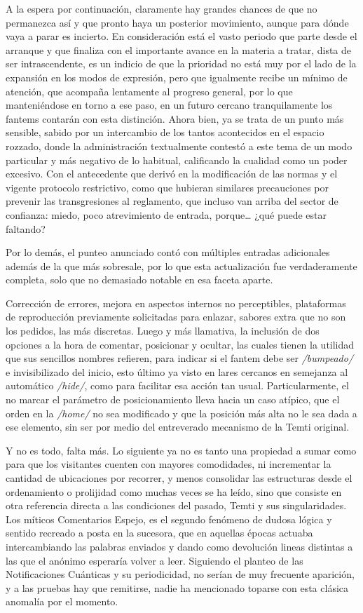 \documentclass[
]{book}
\begin{document}
A la espera por continuación, claramente hay grandes chances de que no permanezca así y que pronto haya un posterior movimiento, aunque para dónde vaya a parar es incierto. En consideración está el vasto periodo que parte desde el arranque y que finaliza con el importante avance en la materia a tratar, dista de ser intrascendente, es un indicio de que la prioridad no está muy por el lado de la expansión en los modos de expresión, pero que igualmente recibe un mínimo de atención, que acompaña lentamente al progreso general, por lo que manteniéndose en torno a ese paso, en un futuro cercano tranquilamente los fantems contarán con esta distinción. Ahora bien, ya se trata de un punto más sensible, sabido por un intercambio de los tantos acontecidos en el espacio rozzado, donde la administración textualmente contestó a este tema de un modo particular y más negativo de lo habitual, calificando la cualidad como un poder excesivo. Con el antecedente que derivó en la modificación de las normas y el vigente protocolo restrictivo, como que hubieran similares precauciones por prevenir las transgresiones al reglamento, que incluso van arriba del sector de confianza: miedo, poco atrevimiento de entrada, porque\ldots{} ¿qué puede estar faltando?

Por lo demás, el punteo anunciado contó con múltiples entradas adicionales además de la que más sobresale, por lo que esta actualización fue verdaderamente completa, solo que no demasiado notable en esa faceta aparte.

Corrección de errores, mejora en aspectos internos no perceptibles, plataformas de reproducción previamente solicitadas para enlazar, sabores extra que no son los pedidos, las más discretas. Luego y más llamativa, la inclusión de dos opciones a la hora de comentar, posicionar y ocultar, las cuales tienen la utilidad que sus sencillos nombres refieren, para indicar si el fantem debe ser \emph{/bumpeado/} e invisibilizado del inicio, esto último ya visto en lares cercanos en semejanza al automático \emph{/hide/}, como para facilitar esa acción tan usual. Particularmente, el no marcar el parámetro de posicionamiento lleva hacia un caso atípico, que el orden en la \emph{/home/} no sea modificado y que la posición más alta no le sea dada a ese elemento, sin ser por medio del entreverado mecanismo de la Temti original.

Y no es todo, falta más. Lo siguiente ya no es tanto una propiedad a sumar como para que los visitantes cuenten con mayores comodidades, ni incrementar la cantidad de ubicaciones por recorrer, y menos consolidar las estructuras desde el ordenamiento o prolijidad como muchas veces se ha leído, sino que consiste en otra referencia directa a las condiciones del pasado, Temti y sus singularidades. Los míticos Comentarios Espejo, es el segundo fenómeno de dudosa lógica y sentido recreado a posta en la sucesora, que en aquellas épocas actuaba intercambiando las palabras enviados y dando como devolución lineas distintas a las que el anónimo esperaría volver a leer. Siguiendo el planteo de las Notificaciones Cuánticas y su periodicidad, no serían de muy frecuente aparición, y a las pruebas hay que remitirse, nadie ha mencionado toparse con esta clásica anomalía por el momento.
\end{document}
